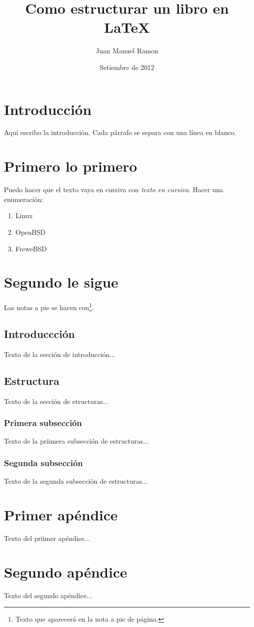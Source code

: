 \documentclass{book}
\begin{document}
\title{Como estructurar un libro en LaTeX}
\author{Juan Manuel Ramon}
\date{Setiembre de 2012}
\maketitle

\frontmatter

\tableofcontents


\chapter{Introducción}
Aquí escribo la introducción. Cada párrafo se separa con una línea en blanco.
\mainmatter
 
\chapter{Primero lo primero}
Puedo hacer que el texto vaya en cursiva con \emph{texto en cursiva}. Hacer una enumeración:
\begin{enumerate}
\item Linux
\item OpenBSD
\item FreweBSD
\end{enumerate}


\chapter{Segundo le sigue}
Las notas a  pie se hacen con\footnote{Texto que aparecerá en la nota a pie de página.}.

\section{Introduccción}
Texto de la sección de introducción...

\section{Estructura}
Texto de la sección de etructuras...

\subsection{Primera subsección}
Texto de la priimera subsección de estructuras...

\subsection{Segunda subsección}
Texto de la segunda subsección de estructuras...

\appendix
\chapter{Primer apéndice}
Texto del priimer apéndice...

\chapter{Segundo apéndice}
Texto del segundo apéndice...

\backmatter
\end{document}
